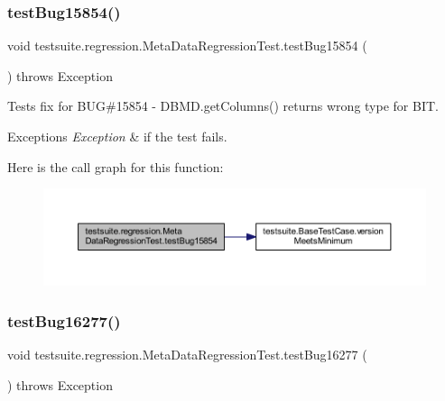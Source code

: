 \subsubsection{\texorpdfstring{test\+Bug15854()}{testBug15854()}}
{\footnotesize\ttfamily void testsuite.\+regression.\+Meta\+Data\+Regression\+Test.\+test\+Bug15854 (\begin{DoxyParamCaption}{ }\end{DoxyParamCaption}) throws Exception}

Tests fix for B\+UG\#15854 -\/ D\+B\+M\+D.\+get\+Columns() returns wrong type for B\+IT.


\begin{DoxyExceptions}{Exceptions}
{\em Exception} & if the test fails. \\
\hline
\end{DoxyExceptions}
Here is the call graph for this function\+:
\nopagebreak
\begin{figure}[H]
\begin{center}
\leavevmode
\includegraphics[width=350pt]{classtestsuite_1_1regression_1_1_meta_data_regression_test_ae112984f3c8acf28251912e13475421c_cgraph}
\end{center}
\end{figure}
\mbox{\label{classtestsuite_1_1regression_1_1_meta_data_regression_test_a7ddf69bf32cb524239b07b822585d44d}} 
\subsubsection{\texorpdfstring{test\+Bug16277()}{testBug16277()}}
{\footnotesize\ttfamily void testsuite.\+regression.\+Meta\+Data\+Regression\+Test.\+test\+Bug16277 (\begin{DoxyParamCaption}{ }\end{DoxyParamCaption}) throws Exception}

